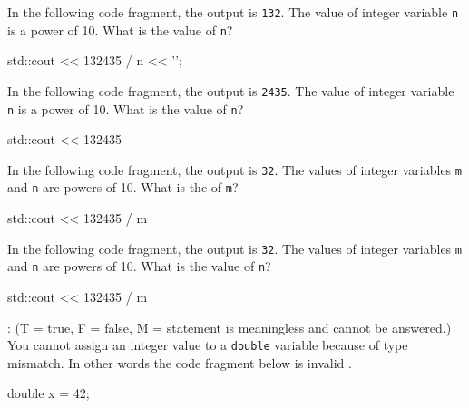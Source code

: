 \nextq
In the following code fragment, the output is \verb!132!.
The value of integer variable \verb!n! is a power of 10.
What is the value of \verb!n!?
\begin{console}[fontsize=\footnotesize]
std::cout << 132435 / n << '\n';
\end{console}
\ANSWER
\begin{answercode}

\end{answercode}

\nextq
In the following code fragment, the output is \verb!2435!.
The value of integer variable \verb!n! is a power of 10.
What is the value of \verb!n!?
\begin{console}[fontsize=\footnotesize]
std::cout << 132435 %
\end{console}
\ANSWER
\begin{answercode}

\end{answercode}

\nextq
In the following code fragment, the output is \verb!32!.
The values of integer variables \verb!m! and \verb!n! are powers of 10.
What is the of \verb!m!?
\begin{console}[fontsize=\footnotesize]
std::cout << 132435 / m %
\end{console}
\ANSWER
\begin{answercode}

\end{answercode}

\nextq
In the following code fragment, the output is \verb!32!.
The values of integer variables \verb!m! and \verb!n! are powers of 10.
What is the value of \verb!n!?
\begin{console}[fontsize=\footnotesize]
std::cout << 132435 / m %
\end{console}
\ANSWER
\begin{answercode}

\end{answercode}

\nextq
\tf:
(T = true, F = false, M = statement is meaningless and cannot be answered.)
You cannot assign an integer value to a \verb!double! variable because
of type mismatch.
In other words the code fragment below is invalid \cpp.
\begin{console}[fontsize=\footnotesize]
double x = 42;
\end{console}
\ANSWER
\begin{answercode}

\end{answercode}

